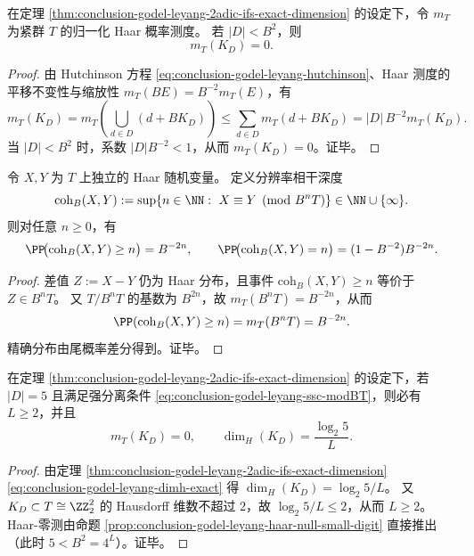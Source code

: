 \begin{proposition}\label{prop:conclusion-godel-leyang-haar-null-small-digit}
在定理 \ref{thm:conclusion-godel-leyang-2adic-ifs-exact-dimension} 的设定下，令 \(m_T\) 为紧群 \(T\) 的归一化 Haar 概率测度。
若 \(|D|<B^2\)，则
\[
m_T(K_D)=0.
\]
\end{proposition}
\begin{proof}
由 Hutchinson 方程 \eqref{eq:conclusion-godel-leyang-hutchinson}、Haar 测度的平移不变性与缩放性 \(m_T(BE)=B^{-2}m_T(E)\)，有
\[
m_T(K_D)
=m_T\!\left(\bigcup_{d\in D}(d+BK_D)\right)
\le \sum_{d\in D}m_T(d+BK_D)
=|D|\,B^{-2}m_T(K_D).
\]
当 \(|D|<B^2\) 时，系数 \(|D|B^{-2}<1\)，从而 \(m_T(K_D)=0\)。证毕。
\end{proof}

\begin{proposition}\label{prop:conclusion-godel-leyang-haar-coherence-depth}
令 \(X,Y\) 为 \(T\) 上独立的 Haar 随机变量。
定义分辨率相干深度
\[
\mathrm{coh}_B(X,Y):=\sup\{n\in\NN:\ X\equiv Y\pmod{B^nT}\}\in\NN\cup\{\infty\}.
\]
则对任意 \(n\ge 0\)，有
\[
\PP\!\bigl(\mathrm{coh}_B(X,Y)\ge n\bigr)=B^{-2n},
\qquad
\PP\!\bigl(\mathrm{coh}_B(X,Y)=n\bigr)=(1-B^{-2})B^{-2n}.
\]
\end{proposition}
\begin{proof}
差值 \(Z:=X-Y\) 仍为 Haar 分布，且事件 \(\mathrm{coh}_B(X,Y)\ge n\) 等价于 \(Z\in B^nT\)。
又 \(T/B^nT\) 的基数为 \(B^{2n}\)，故 \(m_T(B^nT)=B^{-2n}\)，从而
\[
\PP(\mathrm{coh}_B(X,Y)\ge n)=m_T(B^nT)=B^{-2n}.
\]
精确分布由尾概率差分得到。证毕。
\end{proof}

\begin{corollary}\label{cor:conclusion-godel-leyang-five-digit-rigidity}
在定理 \ref{thm:conclusion-godel-leyang-2adic-ifs-exact-dimension} 的设定下，若 \(|D|=5\) 且满足强分离条件 \eqref{eq:conclusion-godel-leyang-ssc-modBT}，则必有 \(L\ge 2\)，并且
\[
m_T(K_D)=0,
\qquad
\dim_H(K_D)=\frac{\log_2 5}{L}.
\]
\end{corollary}
\begin{proof}
由定理 \ref{thm:conclusion-godel-leyang-2adic-ifs-exact-dimension}\eqref{eq:conclusion-godel-leyang-dimh-exact} 得 \(\dim_H(K_D)=\log_2 5/L\)。
又 \(K_D\subset T\cong \ZZ_2^2\) 的 Hausdorff 维数不超过 \(2\)，故 \(\log_2 5/L\le 2\)，从而 \(L\ge 2\)。
Haar-零测由命题 \ref{prop:conclusion-godel-leyang-haar-null-small-digit} 直接推出（此时 \(5<B^2=4^L\)）。证毕。
\end{proof}

